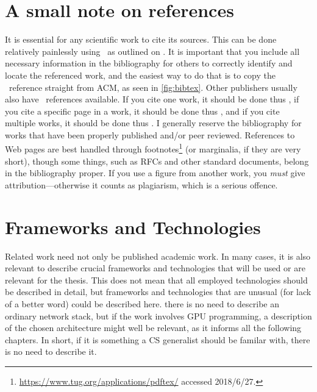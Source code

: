 \section{A small note on references}
\label{sec:small-note-refer}

It is essential for any scientific work to cite its sources. This can be done
relatively painlessly using \mBibTeX\ as outlined on
. It is important that you include all necessary
information in the bibliography for others to correctly identify and locate the
referenced work, and the easiest way to do that is to copy the \mBibTeX\
reference straight from ACM, as seen in \autoref{fig:bibtex}.  Other publishers usually also have \mBibTeX\ references available. If you cite one
work, it should be done thus \cite{Kristensen2010:MP2P2010}, if you cite a
specific page in a work, it should be done thus
\cite[p. 410]{Chawathe2003:2003}, and if you cite multiple works, it should be
done thus
\cite{knuth:1976,knuth:1974,Kristensen2010:MP2P2010,Mittelbach2004:TLC2004}.  I
generally reserve the bibliography for works that have been properly published
and/or peer reviewed. References to Web pages are best handled through
footnotes\footnote{\url{https://www.tug.org/applications/pdftex/} accessed
  2018/6/27.} (or marginalia, if they are very
short), though some things, such as
RFCs and other standard documents, belong in the bibliography proper. If you use
a figure from another work, you \emph{must} give attribution---otherwise it counts
as plagiarism, which is a serious offence.


\section{Frameworks and Technologies}
\label{sec:fram-techn}

Related work need not only be published academic work. In many cases, it is
also relevant to describe crucial frameworks and technologies that will be
used or are relevant for the thesis.  This does not mean that all employed
technologies should be described in detail, but frameworks and technologies
that are unusual (for lack of a better word) could be described here. \Eg
there is no need to describe an ordinary network stack, but if the work
involves GPU programming, a description of the chosen architecture might well
be relevant, as it informs all the following chapters.  In short, if it is
something a CS generalist should be familar with, there is no need to describe
it.

